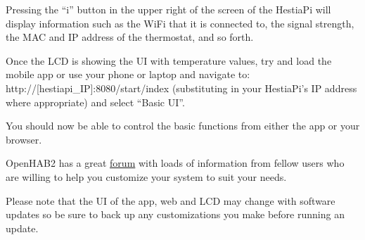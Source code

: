 Pressing the ``i'' button in the upper right of the screen of the HestiaPi will
display information such as the WiFi that it is connected to, the signal
strength, the MAC and IP address of the thermostat, and so forth.

Once the LCD is showing the UI with temperature values, try and load the mobile
app or use your phone or laptop and navigate to:
http://[hestiapi\_IP]:8080/start/index (substituting in your HestiaPi's IP
address where appropriate) and select ``Basic UI''.

You should now be able to control the basic functions from either the app or
your browser.

OpenHAB2 has a great \href{https://community.openhab.org/}{forum} with loads of
information from fellow users who are willing to help you customize your system
to suit your needs.

Please note that the UI of the app, web and LCD may change with software updates
so be sure to back up any customizations you make before running an update.
